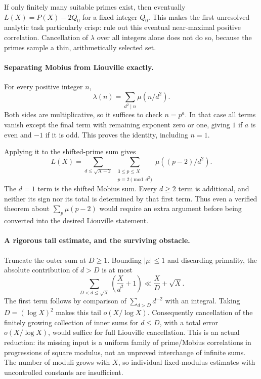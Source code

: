 \documentclass[11pt,a4paper]{article}
\begin{document}
If only finitely many suitable primes exist, then eventually $L(X)=P(X)-2Q_0$ for a fixed integer $Q_0$. This makes the first unresolved analytic task particularly crisp: rule out this eventual near-maximal positive correlation. Cancellation of $\lambda$ over all integers alone does not do so, because the primes sample a thin, arithmetically selected set.

\paragraph{Separating Mobius from Liouville exactly.}
For every positive integer $n$,
\[
 \lambda(n)=\sum_{d^2\mid n}\mu(n/d^2).
\]
Both sides are multiplicative, so it suffices to check $n=p^a$. In that case all terms vanish except the final term with remaining exponent zero or one, giving $1$ if $a$ is even and $-1$ if it is odd. This proves the identity, including $n=1$.

Applying it to the shifted-prime sum gives
\[
 L(X)=\sum_{d\leq\sqrt{X-2}}\ 
 \sum_{\substack{3\leq p\leq X\\p\equiv2\pmod{d^2}}}
 \mu((p-2)/d^2).
\]
The $d=1$ term is the shifted Mobius sum. Every $d\geq2$ term is additional, and neither its sign nor its total is determined by that first term. Thus even a verified theorem about $\sum_p\mu(p-2)$ would require an extra argument before being converted into the desired Liouville statement.

\paragraph{A rigorous tail estimate, and the surviving obstacle.}
Truncate the outer sum at $D\geq1$. Bounding $|\mu|\leq1$ and discarding primality, the absolute contribution of $d>D$ is at most
\[
 \sum_{D<d\leq\sqrt X}\left(\frac{X}{d^2}+1\right)
 \ll\frac XD+\sqrt X.
\]
The first term follows by comparison of $\sum_{d>D}d^{-2}$ with an integral. Taking $D=(\log X)^2$ makes this tail $o(X/\log X)$. Consequently cancellation of the finitely growing collection of inner sums for $d\leq D$, with a total error $o(X/\log X)$, would suffice for full Liouville cancellation. This is an actual reduction: its missing input is a uniform family of prime/Mobius correlations in progressions of square modulus, not an unproved interchange of infinite sums. The number of moduli grows with $X$, so individual fixed-modulus estimates with uncontrolled constants are insufficient.
\end{document}
